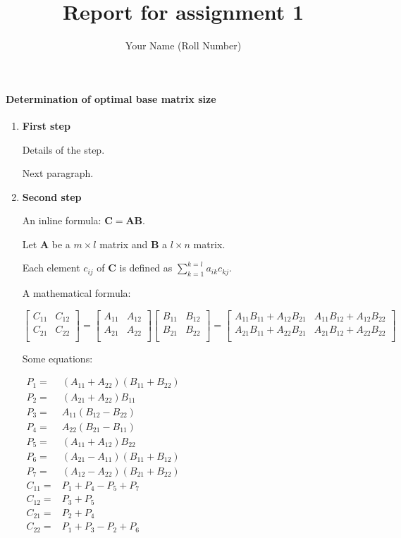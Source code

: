 \documentclass[a4paper,11pt]{article}
\title{Report for assignment 1}
\author{Your Name (Roll Number)}
\begin{document}
\maketitle

\paragraph{Determination of optimal base matrix size}
\begin{enumerate}
 \item \textbf{First step}

Details of the step.

Next paragraph.

 \item \textbf{Second step}

An inline formula: $\mathbf{C} = \mathbf{A} \mathbf{B}$.

Let $\mathbf{A}$ be a $m \times l$ matrix and $\mathbf{B}$
a $l \times n$ matrix.

Each element $c_{ij}$ of $\mathbf{C}$ is defined as
$\sum_{k=1}^{k=l} a_{ik}c_{kj}$.

A mathematical formula:

\(
\left[
\begin{array}{cc}
C_{11}&C_{12}\\
C_{21}&C_{22}\\
\end{array}
\right]
=
\left[
\begin{array}{cc}
A_{11}&A_{12}\\
A_{21}&A_{22}\\
\end{array}
\right]
\left[
\begin{array}{cc}
B_{11}&B_{12}\\
B_{21}&B_{22}\\
\end{array}
\right]
=
\left[
\begin{array}{cc}
A_{11}B_{11} + A_{12}B_{21} & A_{11}B_{12} + A_{12}B_{22}\\
A_{21}B_{11} + A_{22}B_{21} & A_{21}B_{12} + A_{22}B_{22}\\
\end{array}
\right]
\)

Some equations:

\(
\begin{array}{cc}
P_1 =& (A_{11}+ A_{22})(B_{11}+B_{22})\\
P_2 =& (A_{21}+A_{22})B_{11}\\
P_3 =& A_{11}(B_{12}-B_{22})\\
P_4 =& A_{22}(B_{21}-B_{11})\\
P_5 =& (A_{11}+A_{12})B_{22}\\
P_6 =& (A_{21}-A_{11})(B_{11}+B_{12})\\
P_7 =& (A_{12}-A_{22})(B_{21}+B_{22})\\
C_{11}=& P_1 + P_4 - P_5 + P_7\\
C_{12}=& P_3 + P_5\\
C_{21}=& P_2 + P_4\\
C_{22}=& P_1 + P_3 - P_2 + P_6\\
\end{array}
\)


\end{enumerate}
\end{document}

